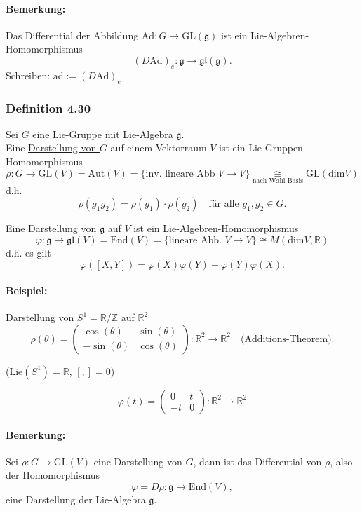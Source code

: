 \documentclass[fleqn, 12pt, letterpaper]{article}
\newcommand{\txt}[1]{\text{#1}}
\begin{document}
\paragraph{Bemerkung:}
Das Differential der Abbildung $\mathrm{Ad} \colon G \to \mathrm{GL}(\mathfrak{g})$ ist ein Lie-Algebren-Homomorphismus
\[
(D \mathrm{Ad})_e \colon \mathfrak{g} \to \mathfrak{gl}(\mathfrak{g}).
\]
Schreiben: \quad $\mathrm{ad} := (D \mathrm{Ad})_e$

\subsubsection*{Definition 4.30}
Sei $G$ eine Lie-Gruppe mit Lie-Algebra $\mathfrak{g}$.\\
Eine \underline{Darstellung von $G$} auf einem Vektorraum $V$ ist ein Lie-Gruppen-Homomorphismus
\[
\rho \colon G \to \mathrm{GL}(V) = \mathrm{Aut}(V) =\{\txt{inv. lineare Abb }V\rightarrow V\} \underset{\txt{nach Wahl Basis}}{\cong} \mathrm{GL}(\txt{dim}V)
\]
d.h.
\[
\rho(g_1 g_2) = \rho(g_1) \cdot \rho(g_2) \quad \text{für alle } g_1, g_2 \in G.
\]

\medskip
Eine \underline{Darstellung von $\mathfrak{g}$} auf $V$ ist ein Lie-Algebren-Homomorphismus
\[
\varphi \colon \mathfrak{g} \to \mathfrak{gl}(V) = \mathrm{End}(V) =\{\txt{lineare Abb. }V\rightarrow V\}\cong M(\txt{dim}V, \mathbb{R}) 
\]
d.h. es gilt
\[
\varphi([X, Y]) = \varphi(X) \varphi(Y) - \varphi(Y) \varphi(X).
\]

\medskip
\paragraph{Beispiel:} Darstellung von $S^1 = \mathbb{R}/\mathbb{Z}$ auf $\mathbb{R}^2$
\[
\rho(\theta) = \begin{pmatrix}
\cos(\theta) & \sin(\theta) \\
-\sin(\theta) & \cos(\theta)
\end{pmatrix} \colon \mathbb{R}^2 \to \mathbb{R}^2
\quad \text{(Additions-Theorem)}.
\]

\medskip
(Lie$(S^1) = \mathbb{R}$, $[,] = 0$)

\[
\varphi(t) = \begin{pmatrix}
0 & t \\
-t & 0
\end{pmatrix} \colon \mathbb{R}^2 \to \mathbb{R}^2
\]

\paragraph{Bemerkung:}
Sei $\rho \colon G \to \mathrm{GL}(V)$ eine Darstellung von $G$, dann ist das Differential von $\rho$, also der Homomorphismus
\[
\varphi = D\rho \colon \mathfrak{g} \to \mathrm{End}(V),
\]
eine Darstellung der Lie-Algebra $\mathfrak{g}$.\\
\end{document}
